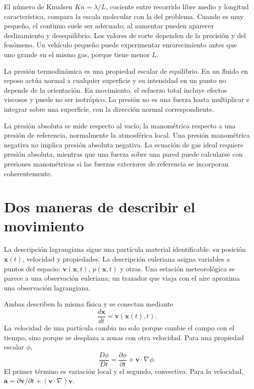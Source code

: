 El número de Knudsen $Kn=\lambda/L$, cociente entre recorrido libre medio y longitud característica, compara la escala molecular con la del problema. Cuando es muy pequeño, el continuo suele ser adecuado; al aumentar pueden aparecer deslizamiento y desequilibrio. Los valores de corte dependen de la precisión y del fenómeno. Un vehículo pequeño puede experimentar enrarecimiento antes que uno grande en el mismo gas, porque tiene menor $L$.

La presión termodinámica es una propiedad escalar de equilibrio. En un fluido en reposo actúa normal a cualquier superficie y su intensidad en un punto no depende de la orientación. En movimiento, el esfuerzo total incluye efectos viscosos y puede no ser isotrópico. La presión no es una fuerza hasta multiplicar e integrar sobre una superficie, con la dirección normal correspondiente.

La presión absoluta se mide respecto al vacío; la manométrica respecto a una presión de referencia, normalmente la atmosférica local. Una presión manométrica negativa no implica presión absoluta negativa. La ecuación de gas ideal requiere presión absoluta, mientras que una fuerza sobre una pared puede calcularse con presiones manométricas si las fuerzas exteriores de referencia se incorporan coherentemente.

\section{Dos maneras de describir el movimiento}
La descripción lagrangiana sigue una partícula material identificable: su posición $\boldsymbol{x}(t)$, velocidad y propiedades. La descripción euleriana asigna variables a puntos del espacio: $\boldsymbol{v}(\boldsymbol{x},t)$, $p(\boldsymbol{x},t)$ y otras. Una estación meteorológica se parece a una observación euleriana; un trazador que viaja con el aire aproxima una observación lagrangiana.

Ambas describen la misma física y se conectan mediante
\begin{equation}
 \frac{d\boldsymbol{x}}{dt}=\boldsymbol{v}(\boldsymbol{x}(t),t).
\end{equation}
La velocidad de una partícula cambia no solo porque cambie el campo con el tiempo, sino porque se desplaza a zonas con otra velocidad. Para una propiedad escalar $\phi$,
\begin{equation}\label{eq:06-material}
 \frac{D\phi}{Dt}=\frac{\partial\phi}{\partial t}+\boldsymbol{v}\cdot\nabla\phi.
\end{equation}
El primer término es variación local y el segundo, convectiva. Para la velocidad, $\boldsymbol{a}=\partial\boldsymbol{v}/\partial t+(\boldsymbol{v}\cdot\nabla)\boldsymbol{v}$.

